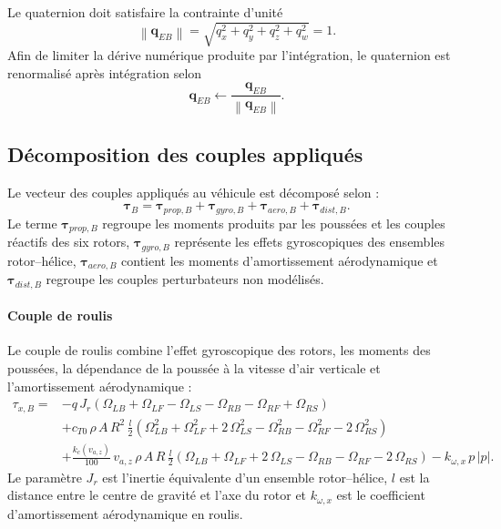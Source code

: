 \documentclass[11pt,a4paper,oneside]{report}
\begin{document}
	Le quaternion doit satisfaire la contrainte d'unité
	\begin{equation}
		\left\lVert\mathbf{q}_{EB}\right\rVert
		=
		\sqrt{q_x^2+q_y^2+q_z^2+q_w^2}
		=
		1.
		\label{eq_quaternion_unit_constraint}
	\end{equation}
	Afin de limiter la dérive numérique produite par l'intégration, le quaternion est renormalisé après intégration selon
	\begin{equation}
		\mathbf{q}_{EB}
		\leftarrow
		\frac{\mathbf{q}_{EB}}
		{\left\lVert\mathbf{q}_{EB}\right\rVert}.
		\label{eq_quaternion_normalization}
	\end{equation}
	
	\subsection{Décomposition des couples appliqués}
	Le vecteur des couples appliqués au véhicule est décomposé selon :
	\begin{equation}
		\boldsymbol{\tau}_B=\boldsymbol{\tau}_{prop,B}+\boldsymbol{\tau}_{gyro,B}+\boldsymbol{\tau}_{aero,B}+\boldsymbol{\tau}_{dist,B}.
		\label{eq_torque_decomposition}
	\end{equation}
	Le terme \(\boldsymbol{\tau}_{prop,B}\) regroupe les moments produits par les poussées et les couples réactifs des six rotors, \(\boldsymbol{\tau}_{gyro,B}\) représente les effets gyroscopiques des ensembles rotor--hélice, \(\boldsymbol{\tau}_{aero,B}\) contient les moments d'amortissement aérodynamique et \(\boldsymbol{\tau}_{dist,B}\) regroupe les couples perturbateurs non modélisés.
	
	\paragraph{Couple de roulis}
	Le couple de roulis combine l'effet gyroscopique des rotors, les moments des poussées, la dépendance de la poussée à la vitesse d'air verticale et l'amortissement aérodynamique :
	\begin{align}
		\tau_{x,B}={}&-q\,J_r\left(\Omega_{LB}+\Omega_{LF}-\Omega_{LS}-\Omega_{RB}-\Omega_{RF}+\Omega_{RS}\right)\nonumber\\
		&+c_{T0}\,\rho\,A\,R^2\,\frac{l}{2}\left(\Omega_{LB}^2+\Omega_{LF}^2+2\,\Omega_{LS}^2-\Omega_{RB}^2-\Omega_{RF}^2-2\,\Omega_{RS}^2\right)\nonumber\\
		&+\frac{k_c(v_{a,z})}{100}\,v_{a,z}\,\rho\,A\,R\,\frac{l}{2}\left(\Omega_{LB}+\Omega_{LF}+2\,\Omega_{LS}-\Omega_{RB}-\Omega_{RF}-2\,\Omega_{RS}\right)-k_{\omega,x}\,p\,|p|.
		\label{eq_roll_torque}
	\end{align}
	Le paramètre \(J_r\) est l'inertie équivalente d'un ensemble rotor--hélice, \(l\) est la distance entre le centre de gravité et l'axe du rotor et \(k_{\omega,x}\) est le coefficient d'amortissement aérodynamique en roulis.
	
\end{document}
